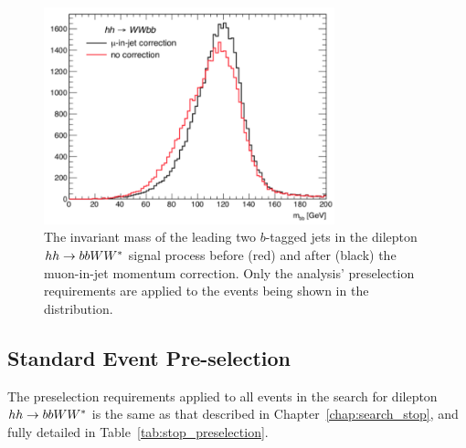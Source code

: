 \begin{figure}[!htb]
    \begin{center}
        \includegraphics[width=0.75\textwidth]{figures/search_hh/bjet_correction_wwbb}
        \caption{
            The invariant mass of the leading two $b$-tagged jets in the dilepton $hh \rightarrow bbWW^*$ signal
            process before (red) and after (black) the muon-in-jet momentum correction.
            Only the analysis' preselection requirements are applied to the events being shown in the distribution.
        }
        \label{fig:bjet_correction}
    \end{center}
\end{figure}

%
%
\subsection{Standard Event Pre-selection}
\label{sec:hh_preselection}

The preselection requirements applied to all events in the search for dilepton $hh \rightarrow bbWW^*$
is the same as that described in Chapter~\ref{chap:search_stop}, and fully detailed in
Table~\ref{tab:stop_preselection}.
